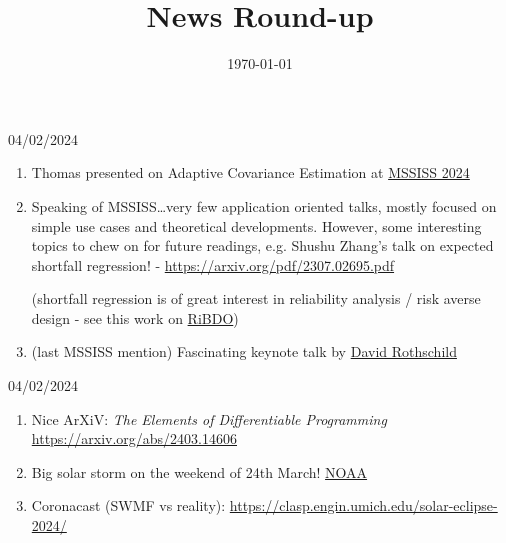 \documentclass[usenames,dvipsnames]{beamer}
\title[Seminar]{News Round-up}
\date{\today}
\theoremstyle{definition}
\begin{document}
\begin{frame}
\titlepage %
\end{frame}





\begin{frame}{04/02/2024}

\begin{enumerate}
    \item Thomas presented on Adaptive Covariance Estimation at \href{https://sites.lsa.umich.edu/mssiss/}{MSSISS 2024}
    
    \item Speaking of MSSISS\dots very few application oriented talks, mostly focused on simple use cases and theoretical developments. However, some interesting topics to chew on for future readings, e.g. Shushu Zhang's talk on expected shortfall regression! - \url{https://arxiv.org/pdf/2307.02695.pdf}
    
    (shortfall regression is of great interest in reliability analysis / risk averse design - see this work on \href{https://kiwi.oden.utexas.edu/papers/Certifiable-Risk-based-engineering-design-optimization-Chaudhuri.pdf}{RiBDO})

    \item (last MSSISS mention) Fascinating keynote talk by \href{https://www.microsoft.com/en-us/research/people/davidmr/}{David Rothschild}
\end{enumerate}

\end{frame}

\begin{frame}{04/02/2024}

\begin{enumerate}
    \item Nice ArXiV: \emph{The Elements of Differentiable Programming} \url{https://arxiv.org/abs/2403.14606}
    
    \item Big solar storm on the weekend of 24th March! \href{https://www.nesdis.noaa.gov/news/noaa-satellites-detect-severe-solar-storm}{NOAA}

    \item Coronacast (SWMF vs reality): \url{https://clasp.engin.umich.edu/solar-eclipse-2024/}
\end{enumerate}
\end{frame}
\end{document}
